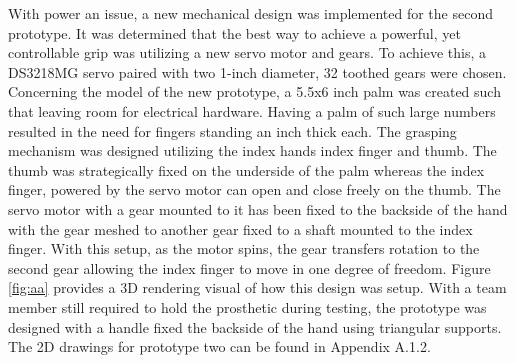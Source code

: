 \documentclass[11.5pt]{article}
\begin{document}
With power an issue, a new mechanical design was implemented for the second prototype. It was determined that the best way to achieve a powerful, yet controllable grip was utilizing a new servo motor and gears. To achieve this, a DS3218MG servo paired with two 1-inch diameter, 32 toothed gears were chosen. Concerning the model of the new prototype, a 5.5x6 inch palm was created such that leaving room for electrical hardware. Having a palm of such large numbers resulted in the need for fingers standing an inch thick each. The grasping mechanism was designed utilizing the index hands index finger and thumb. The thumb was strategically fixed on the underside of the palm whereas the index finger, powered by the servo motor can open and close freely on the thumb. The servo motor with a gear mounted to it has been fixed to the backside of the hand with the gear meshed to another gear fixed to a shaft mounted to the index finger. With this setup, as the motor spins, the gear transfers rotation to the second gear allowing the index finger to move in one degree of freedom. Figure \ref{fig:aa} provides a 3D rendering visual of how this design was setup. With a team member still required to hold the prosthetic during testing, the prototype was designed with a handle fixed the backside of the hand using triangular supports. The 2D drawings for prototype two can be found in Appendix A.1.2.
\end{document}
